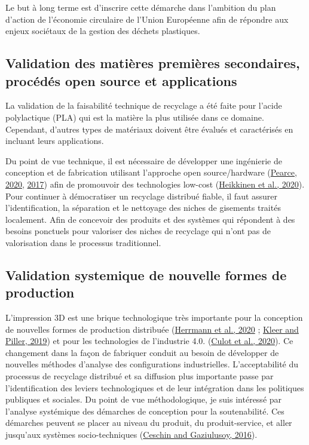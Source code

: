 \documentclass[
  12pt,
  oneside]{book}
\begin{document}
Le but à long terme est d'inscrire cette démarche dans l'ambition du plan d'action de l'économie circulaire de l'Union Européenne afin de répondre aux enjeux sociétaux de la gestion des déchets plastiques.

\hypertarget{validation-des-matiuxe8res-premiuxe8res-secondaires-procuxe9duxe9s-open-source-et-applications}{%
\subsection{Validation des matières premières secondaires, procédés open source et applications}\label{validation-des-matiuxe8res-premiuxe8res-secondaires-procuxe9duxe9s-open-source-et-applications}}

La validation de la faisabilité technique de recyclage a été faite pour l'acide polylactique (PLA) qui est la matière la plus utilisée dans ce domaine. Cependant, d'autres types de matériaux doivent être évalués et caractérisés en incluant leurs applications.

Du point de vue technique, il est nécessaire de développer une ingénierie de conception et de fabrication utilisant l'approche open source/hardware (\protect\hyperlink{ref-Pearce2020a}{Pearce, 2020}, \protect\hyperlink{ref-Pearce2017b}{2017}) afin de promouvoir des technologies low-cost (\protect\hyperlink{ref-Heikkinen2020a}{Heikkinen et al., 2020}). Pour continuer à démocratiser un recyclage distribué fiable, il faut assurer l'identification, la séparation et le nettoyage des niches de gisements traités localement. Afin de concevoir des produits et des systèmes qui répondent à des besoins ponctuels pour valoriser des niches de recyclage qui n'ont pas de valorisation dans le processus traditionnel.

\hypertarget{validation-systemique-de-nouvelle-formes-de-production}{%
\subsection{Validation systemique de nouvelle formes de production}\label{validation-systemique-de-nouvelle-formes-de-production}}

L'impression 3D est une brique technologique très importante pour la conception de nouvelles formes de production distribuée (\protect\hyperlink{ref-Herrmann2020}{Herrmann et al., 2020} ; \protect\hyperlink{ref-Kleer2019}{Kleer and Piller, 2019}) et pour les technologies de l'industrie 4.0. (\protect\hyperlink{ref-Culot2020}{Culot et al., 2020}). Ce changement dans la façon de fabriquer conduit au besoin de développer de nouvelles méthodes d'analyse des configurations industrielles.
L'acceptabilité du processus de recyclage distribué et sa diffusion plus importante passe par l'identification des leviers technologiques et de leur intégration dans les politiques publiques et sociales. Du point de vue méthodologique, je suis intéressé par l'analyse systémique des démarches de conception pour la soutenabilité. Ces démarches peuvent se placer au niveau du produit, du produit-service, et aller jusqu'aux systèmes socio-techniques (\protect\hyperlink{ref-Ceschin2016}{Ceschin and Gaziulusoy, 2016}).
\end{document}
